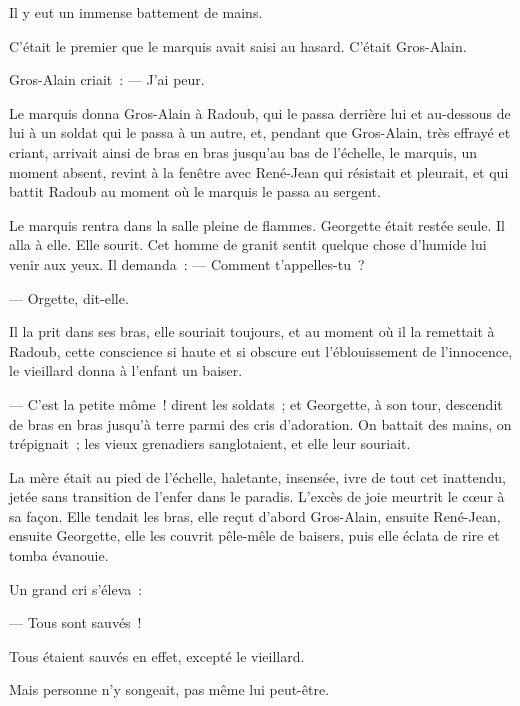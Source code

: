 \documentclass[french,twoside]{book} %
\begin{document}
Il y eut un immense battement de mains.\par
C’était le premier que le marquis avait saisi au hasard. C’était Gros-Alain.\par
Gros-Alain criait : — J’ai peur.\par
Le marquis donna Gros-Alain à Radoub, qui le passa derrière lui et au-dessous de lui à un soldat qui le passa à un autre, et, pendant que Gros-Alain, très  effrayé et criant, arrivait ainsi de bras en bras jusqu’au bas de l’échelle, le marquis, un moment absent, revint à la fenêtre avec René-Jean qui résistait et pleurait, et qui battit Radoub au moment où le marquis le passa au sergent.\par
Le marquis rentra dans la salle pleine de flammes. Georgette était restée seule. Il alla à elle. Elle sourit. Cet homme de granit sentit quelque chose d’humide lui venir aux yeux. Il demanda : — Comment t’appelles-tu ?\par
— Orgette, dit-elle.\par
Il la prit dans ses bras, elle souriait toujours, et au moment où il la remettait à Radoub, cette conscience si haute et si obscure eut l’éblouissement de l’innocence, le vieillard donna à l’enfant un baiser.\par
— C’est la petite môme ! dirent les soldats ; et Georgette, à son tour, descendit de bras en bras jusqu’à terre parmi des cris d’adoration. On battait des mains, on trépignait ; les vieux grenadiers sanglotaient, et elle leur souriait.\par
La mère était au pied de l’échelle, haletante, insensée, ivre de tout cet inattendu, jetée sans transition de l’enfer dans le paradis. L’excès de joie meurtrit le cœur à sa façon. Elle tendait les bras, elle reçut d’abord Gros-Alain, ensuite René-Jean, ensuite Georgette, elle les couvrit pêle-mêle de baisers, puis elle éclata de rire et tomba évanouie.\par
Un grand cri s’éleva :\par
— Tous sont sauvés !\par
Tous étaient sauvés en effet, excepté le vieillard.\par
 Mais personne n’y songeait, pas même lui peut-être.\par
\end{document}
